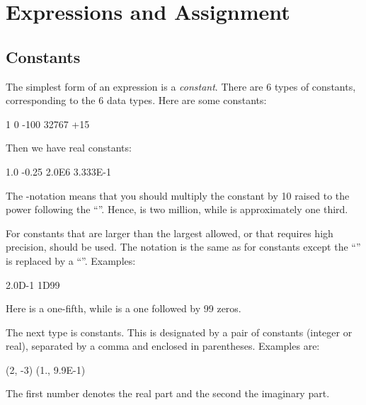 \section{Expressions and Assignment}

\subsection*{Constants}

The simplest form of an expression is a \textit{constant}. There are 6
types of constants, corresponding to the 6 data types. Here are some
 constants:

\begin{code}
      1
      0
      -100
      32767
      +15
\end{code}

Then we have real constants:

\begin{code}
      1.0
      -0.25
      2.0E6
      3.333E-1
\end{code}

The -notation means that you should multiply the constant
by 10 raised to the power following the ``''. Hence,
 is two million, while  is
approximately one third.

For constants that are larger than the largest 
allowed, or that requires high precision,  should be used. The notation is the same as for
 constants except the ``'' is
replaced by a ``''. Examples:

\begin{code}
      2.0D-1
      1D99
\end{code}

Here  is a 
one-fifth, while  is a one followed by 99 zeros.

The next type is  constants. This is designated
by a pair of constants (integer or real), separated by a comma and
enclosed in parentheses. Examples are:

\begin{code}
      (2, -3)
      (1., 9.9E-1)
\end{code}

The first number denotes the real part and the second the imaginary part.

